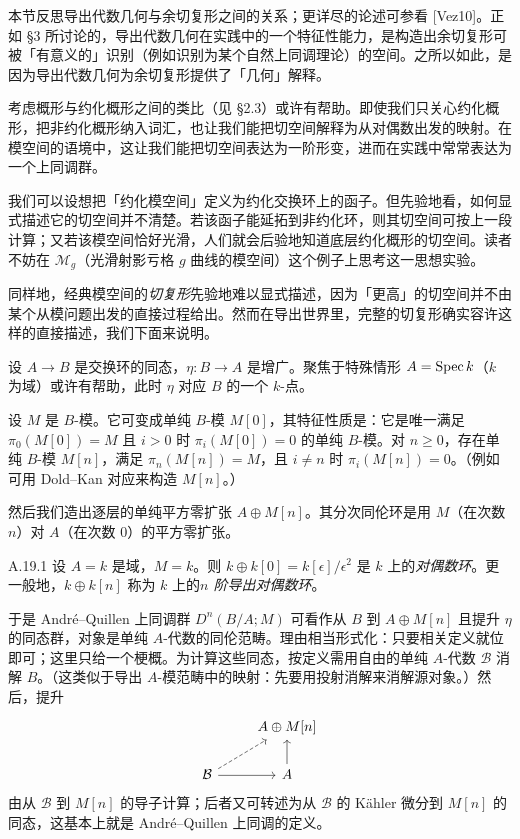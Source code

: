 本节反思导出代数几何与余切复形之间的关系；更详尽的论述可参看 [Vez10]。正如 §3 所讨论的，导出代数几何在实践中的一个特征性能力，是构造出余切复形可被「有意义的」识别（例如识别为某个自然上同调理论）的空间。之所以如此，是因为导出代数几何为余切复形提供了「几何」解释。

考虑概形与约化概形之间的类比（见 §2.3）或许有帮助。即使我们只关心约化概形，把非约化概形纳入词汇，也让我们能把切空间解释为从对偶数出发的映射。在模空间的语境中，这让我们能把切空间表达为一阶形变，进而在实践中常常表达为一个上同调群。

我们可以设想把「约化模空间」定义为约化交换环上的函子。但先验地看，如何显式描述它的切空间并不清楚。若该函子能延拓到非约化环，则其切空间可按上一段计算；又若该模空间恰好光滑，人们就会后验地知道底层约化概形的切空间。读者不妨在 $\mathcal M_g$（光滑射影亏格 $g$ 曲线的模空间）这个例子上思考这一思想实验。

同样地，经典模空间的\emph{切复形}先验地难以显式描述，因为「更高」的切空间并不由某个从模问题出发的直接过程给出。然而在导出世界里，完整的切复形确实容许这样的直接描述，我们下面来说明。

设 $A\to B$ 是交换环的同态，$\eta\colon B\to A$ 是增广。聚焦于特殊情形 $A=\operatorname{Spec} k$（$k$ 为域）或许有帮助，此时 $\eta$ 对应 $B$ 的一个 $k$-点。

设 $M$ 是 $B$-模。它可变成单纯 $B$-模 $M[0]$，其特征性质是：它是唯一满足 $\pi_0(M[0])=M$ 且 $i>0$ 时 $\pi_i(M[0])=0$ 的单纯 $B$-模。对 $n\ge0$，存在单纯 $B$-模 $M[n]$，满足 $\pi_n(M[n])=M$，且 $i\ne n$ 时 $\pi_i(M[n])=0$。（例如可用 Dold--Kan 对应来构造 $M[n]$。）

然后我们造出逐层的单纯平方零扩张 $A\oplus M[n]$。其分次同伦环是用 $M$（在次数 $n$）对 $A$（在次数 0）的平方零扩张。

\begin{exam}{A.19.1}\label{thm:a6-08-14}
设 $A=k$ 是域，$M=k$。则 $k\oplus k[0]=k[\epsilon]/\epsilon^2$ 是 $k$ 上的\emph{对偶数环}。更一般地，$k\oplus k[n]$ 称为 $k$ 上的\emph{$n$ 阶导出对偶数环}。
\end{exam}

于是 André--Quillen 上同调群 $D^n(B/A;M)$ 可看作从 $B$ 到 $A\oplus M[n]$ 且提升 $\eta$ 的同态群，对象是单纯 $A$-代数的同伦范畴。理由相当形式化：只要相关定义就位即可；这里只给一个梗概。为计算这些同态，按定义需用自由的单纯 $A$-代数 $\mathcal B$ 消解 $B$。（这类似于导出 $A$-模范畴中的映射：先要用投射消解来消解源对象。）然后，提升
\[
\begin{tikzcd}
& A\oplus M[n] \\
\mathcal B \arrow[r] \arrow[ur, dashed] & A \arrow[u]
\end{tikzcd}
\]
由从 $\mathcal B$ 到 $M[n]$ 的导子计算；后者又可转述为从 $\mathcal B$ 的 Kähler 微分到 $M[n]$ 的同态，这基本上就是 André--Quillen 上同调的定义。

